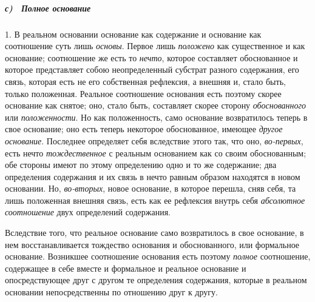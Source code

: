\subparagraph[с) \ Полное основание]{с) \ Полное основание}
\hypertarget{Toc478978730}{}1. В реальном основании основание как содержание
и основание как соотношение суть лишь {\em основы}.
Первое лишь {\em положено} как существенное и как
основание; соотношение же есть то {\em нечто}, которое
составляет обоснованное и которое представляет собою неопределенный
субстрат разного содержания, его связь, которая есть не его собственная
рефлексия, а внешняя и, стало быть, только положенная. Реальное соотношение
основания есть поэтому скорее основание как снятое; оно, стало быть,
составляет скорее сторону {\em обоснованного} или
{\em положенности}. Но как положенность, само основание
возвратилось теперь в свое основание; оно есть теперь некоторое
обоснованное, имеющее {\em другое основание}. Последнее
определяет себя вследствие этого так, что оно,
{\em во-первых}, есть нечто
{\em тождественное} с реальным основанием как со своим
обоснованным; обе стороны имеют по этому определению одно и то же
содержание; два определения содержания и их связь в нечто равным образом
находятся в новом основании. Но, {\em во-вторых}, новое
основание, в которое перешла, сняв себя, та лишь положенная внешняя связь,
есть как ее рефлексия внутрь себя {\em абсолютное
соотношение} двух определений содержания.

Вследствие того, что реальное основание само возвратилось в свое основание,
в нем восстанавливается тождество основания и обоснованного, или формальное
основание. Возникшее соотношение основания есть поэтому
{\em полное} соотношение, содержащее в себе вместе и
формальное и реальное основание и опосредствующее друг с другом те
определения содержания, которые в реальном основании непосредственны по
отношению друг к другу.

